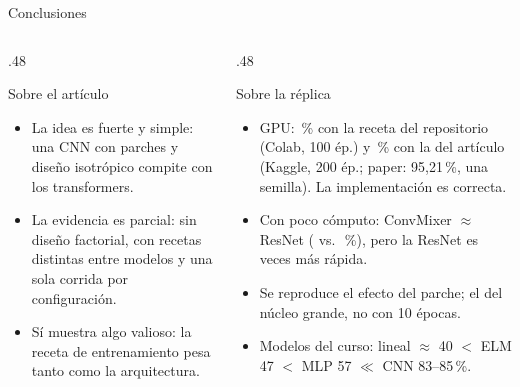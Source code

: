 \begin{frame}{Conclusiones}
  \begin{columns}[T]
    \begin{column}{.48\textwidth}
      \begin{block}{Sobre el artículo}
        \footnotesize
        \begin{itemize}
          \item La idea es fuerte y simple: una CNN con parches y diseño isotrópico compite con los transformers.
          \item La evidencia es parcial: sin diseño factorial, con recetas distintas entre modelos y una sola corrida
          por configuración.
          \item Sí muestra algo valioso: la receta de entrenamiento pesa tanto como la arquitectura.
        \end{itemize}
      \end{block}
    \end{column}
    \begin{column}{.48\textwidth}
      \begin{block}{Sobre la réplica}
        \footnotesize
        \begin{itemize}
          \item GPU: \accColab\,\% con la receta del repositorio (Colab, 100 ép.) y \accKaggle\,\% con la del artículo (Kaggle, 200 ép.; paper: 95,21\,\%, una semilla). La implementación es correcta.
          \item Con poco cómputo: ConvMixer $\approx$ ResNet (\accCMnueve{} vs.\ \accResNet\,\%), pero la ResNet es
          \ratioTput{} veces más rápida.
          \item Se reproduce el efecto del parche; el del núcleo grande, no con 10 épocas.
          \item Modelos del curso: lineal $\approx$ 40 $<$ ELM 47 $<$ MLP 57 $\ll$ CNN 83--85\,\%.
        \end{itemize}
      \end{block}
    \end{column}
  \end{columns}
\end{frame}
